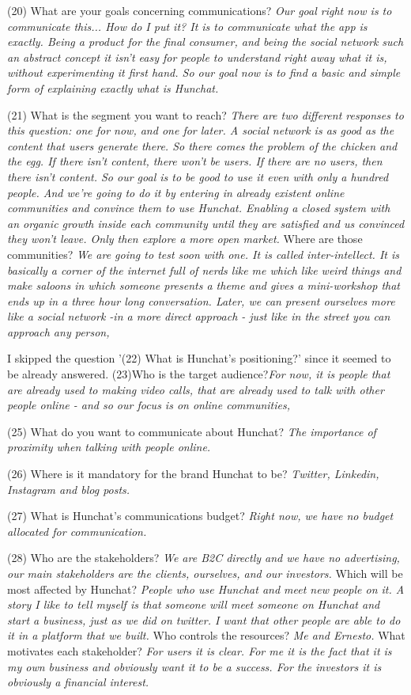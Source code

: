 \documentclass[12pt]{article}
\begin{document}
(20) What are your goals concerning communications? \textit{Our goal right now is to communicate this... How do I put it? It is to communicate what the app is exactly. Being a product for the final consumer, and being the social network such an abstract concept it isn't easy for people to understand right away what it is, without experimenting it first hand. So our goal now is to find a basic and simple form of explaining exactly what is Hunchat.}

(21) What is the segment you want to reach? \textit{There are two different responses to this question: one for now, and one for later. A social network is as good as the content that users generate there. So there comes the problem of the chicken and the egg. If there isn't content, there won't be users. If there are no users, then there isn't content. So our goal is to be good to use it even with only a hundred people. And we're going to do it by entering in already existent online communities and convince them to use Hunchat. Enabling a closed system with an organic growth inside each community until they are satisfied and us convinced they won't leave. Only then explore a more open market.} Where are those communities? \textit{We are going to test soon with one. It is called inter-intellect. It is basically a corner of the internet full of nerds like me which like weird things and make saloons in which someone presents a theme and gives a mini-workshop that ends up in a three hour long conversation. Later, we can present ourselves more like a social network -in a more direct approach - just like in the street you can approach any person,}

I skipped the question '(22) What is Hunchat’s positioning?' since it seemed to be already answered. (23)Who is the target audience?\textit{For now, it is people that are already used to making video calls, that are already used to talk with other people online - and so our focus is on online communities,}

(25) What do you want to communicate about Hunchat? \textit{The importance of proximity when talking with people online.}

(26) Where is it mandatory for the brand Hunchat to be? \textit{Twitter, Linkedin, Instagram and blog posts.}

(27) What is Hunchat’s communications budget? \textit{Right now, we have no budget allocated for communication.}

(28) Who are the stakeholders? \textit{We are B2C directly and we have no advertising, our main stakeholders are the clients, ourselves, and our investors.}  Which will be most affected by Hunchat? \textit{People who use Hunchat and meet new people on it. A story I like to tell myself is that someone will meet someone on Hunchat and start a business, just as we did on twitter. I want that other people are able to do it in a platform that we built. } Who controls the resources? \textit{Me and Ernesto.} What motivates each stakeholder? \textit{For users it is clear. For me it is the fact that it is my own business and obviously want it to be a success. For the investors it is obviously a financial interest.}
\end{document}
